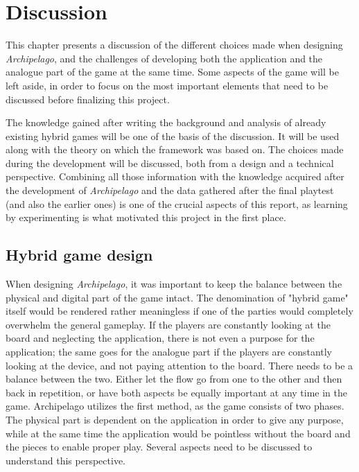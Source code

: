 \chapter{Discussion}
\label{sec:disc}
This chapter presents a discussion of the different choices made when designing \textit{Archipelago}, and the challenges of developing both the application and the analogue part of the game at the same time. Some aspects of the game will be left aside, in order to focus on the most important elements that need to be discussed before finalizing this project.

The knowledge gained after writing the background and analysis of already existing hybrid games will be one of the basis of the discussion. It will be used along with the theory on which the framework was based on. The choices made during the development will be discussed, both from a design and a technical perspective. Combining all those information with the knowledge acquired after the development of \textit{Archipelago} and the data gathered after the final playtest (and also the earlier ones) is one of the crucial aspects of this report, as learning by experimenting is what motivated this project in the first place. 

\section{Hybrid game design}
When designing \textit{Archipelago}, it was important to keep the balance between the physical and digital part of the game intact. The denomination of "hybrid game" itself would be rendered rather meaningless if one of the parties would completely overwhelm the general gameplay. If the players are constantly looking at the board and neglecting the application, there is not even a purpose for the application; the same goes for the analogue part if the players are constantly looking at the device, and not paying attention to the board. There needs to be a balance between the two. Either let the flow go from one to the other and then back in repetition, or have both aspects be equally important at any time in the game. 
Archipelago utilizes the first method, as the game consists of two phases. The physical part is dependent on the application in order to give any purpose, while at the same time the application would be pointless without the board and the pieces to enable proper play. Several aspects need to be discussed to understand this perspective.


